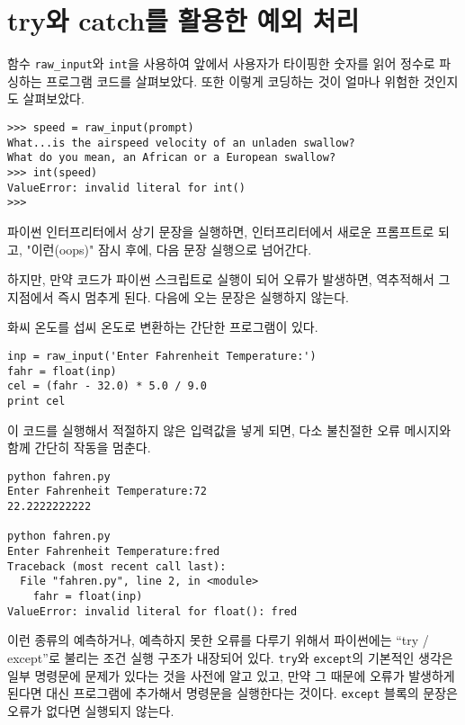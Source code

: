 \section{try와 catch를 활용한 예외 처리}

함수 \verb"raw_input"와 {\tt int}을 사용하여 앞에서 사용자가 타이핑한 숫자를 읽어 정수로 파싱하는 프로그램 코드를 살펴보았다.
또한 이렇게 코딩하는 것이 얼마나 위험한 것인지도 살펴보았다.

\beforeverb
\begin{verbatim}
>>> speed = raw_input(prompt)
What...is the airspeed velocity of an unladen swallow?
What do you mean, an African or a European swallow?
>>> int(speed)
ValueError: invalid literal for int()
>>>
\end{verbatim}
\afterverb
%
파이썬 인터프리터에서 상기 문장을 실행하면, 
인터프리터에서 새로운 프롬프트로 되고, "이런(oops)" 잠시 후에, 다음 문장 실행으로 넘어간다.

하지만, 만약 코드가 파이썬 스크립트로 실행이 되어 오류가 발생하면,
역추적해서 그 지점에서 즉시 멈추게 된다. 다음에 오는 문장은 실행하지 않는다.


화씨 온도를 섭씨 온도로 변환하는 간단한 프로그램이 있다.


\beforeverb
\begin{verbatim}
inp = raw_input('Enter Fahrenheit Temperature:')
fahr = float(inp)
cel = (fahr - 32.0) * 5.0 / 9.0
print cel
\end{verbatim}
\afterverb
%

이 코드를 실행해서 적절하지 않은 입력값을 넣게 되면, 다소 불친절한 오류 메시지와 함께 간단히 작동을 멈춘다.

\beforeverb
\begin{verbatim}
python fahren.py 
Enter Fahrenheit Temperature:72
22.2222222222

python fahren.py 
Enter Fahrenheit Temperature:fred
Traceback (most recent call last):
  File "fahren.py", line 2, in <module>
    fahr = float(inp)
ValueError: invalid literal for float(): fred
\end{verbatim}
\afterverb
%

이런 종류의 예측하거나, 예측하지 못한 오류를 다루기 위해서 파이썬에는 ``try / except''로 불리는 조건 실행 구조가 내장되어 있다.
{\tt try}와 {\tt except}의 기본적인 생각은 일부 명령문에 문제가 있다는 것을 사전에 알고 있고, 
만약 그 때문에 오류가 발생하게 된다면 대신 프로그램에 추가해서 명령문을 실행한다는 것이다. 
{\tt except} 블록의 문장은 오류가 없다면 실행되지 않는다.

